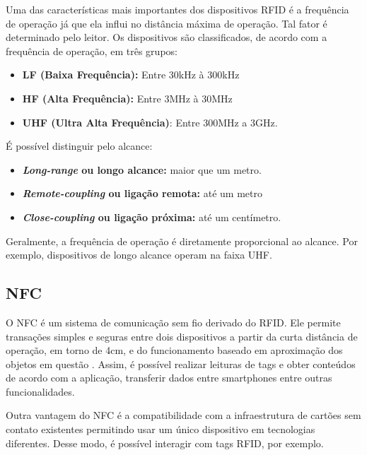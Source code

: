 \documentclass[
	article,			%
	11pt,				%
	oneside,			%
	a4paper,			%
	section=TITLE,		%
	subsection=TITLE,	%
	english,			%
	brazil,				%
	sumario=tradicional
	]{abntex2}
\begin{document}


Uma das características mais importantes dos dispositivos RFID é a frequência de operação já que 
ela influi no distância máxima de operação. Tal fator é determinado pelo leitor. 
Os dispositivos são classificados, de acordo com a frequência de operação, em três grupos:

\begin{itemize} \parskip -4pt
	\item \textbf{LF (Baixa Frequência):} Entre 30kHz à 300kHz
	\item \textbf{HF (Alta Frequência):} Entre 3MHz à 30MHz
	\item \textbf{UHF (Ultra Alta Frequência)}: Entre 300MHz a 3GHz.
\end{itemize}

É possível distinguir pelo alcance:

\begin{itemize} \parskip -4pt
	\item \textbf{\textit{Long-range} ou longo alcance:} maior que um metro.
	\item \textbf{\textit{Remote-coupling} ou ligação remota:} até um metro
	\item \textbf{\textit{Close-coupling} ou ligação próxima:} até um centímetro.
\end{itemize}

Geralmente, a frequência de operação é diretamente proporcional ao alcance. Por exemplo, 
dispositivos de longo alcance operam na faixa UHF. 






\subsection{NFC}
O NFC é um sistema de comunicação sem fio derivado do RFID. Ele permite transações simples e 
seguras entre dois dispositivos a partir da curta distância de operação, em torno de 
4cm, e do funcionamento baseado em aproximação dos objetos em questão \cite{nfcforumabout2017}. 
Assim, é 
possível realizar leituras de tags e obter conteúdos de acordo com a aplicação, transferir dados 
entre smartphones entre outras funcionalidades.

Outra vantagem do NFC é a compatibilidade com a infraestrutura de cartões sem contato 
existentes permitindo usar um único dispositivo em tecnologias diferentes. Desse modo, é possível 
interagir com tags RFID, por exemplo.
\end{document}
